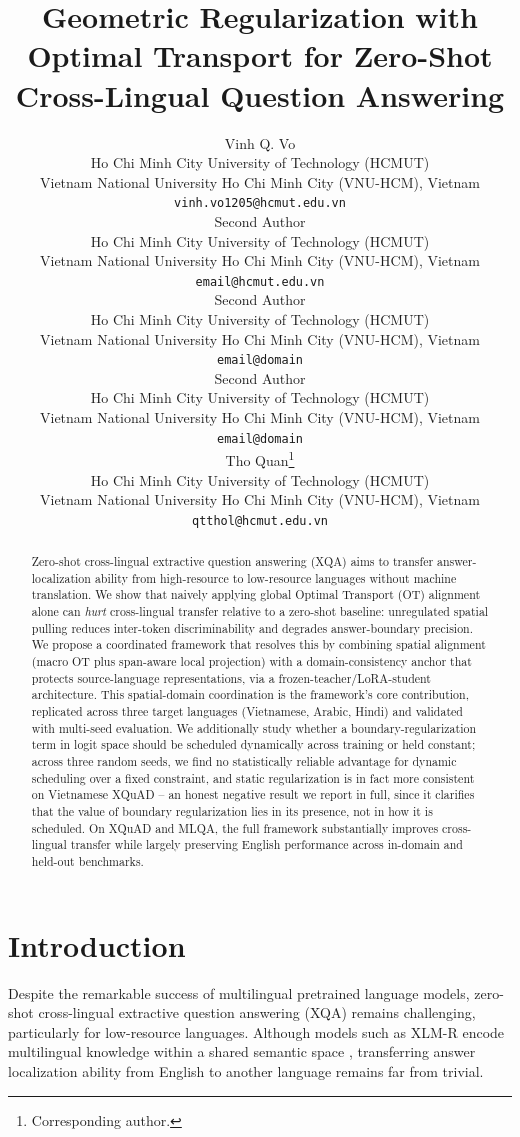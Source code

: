 \documentclass[11pt]{article}
\title{Geometric Regularization with Optimal Transport for Zero-Shot Cross-Lingual Question Answering}
\author{Vinh Q. Vo \\
  Ho Chi Minh City University of Technology (HCMUT) \\
  Vietnam National University Ho Chi Minh City (VNU-HCM), Vietnam \\
  \texttt{vinh.vo1205@hcmut.edu.vn} \\\And
  Second Author \\
  Ho Chi Minh City University of Technology (HCMUT) \\
  Vietnam National University Ho Chi Minh City (VNU-HCM), Vietnam \\
  \texttt{email@hcmut.edu.vn} \\\And
  Second Author \\
  Ho Chi Minh City University of Technology (HCMUT) \\
  Vietnam National University Ho Chi Minh City (VNU-HCM), Vietnam \\
  \texttt{email@domain} \\\And
  Second Author \\
  Ho Chi Minh City University of Technology (HCMUT) \\
  Vietnam National University Ho Chi Minh City (VNU-HCM), Vietnam \\
  \texttt{email@domain} \\\And
  Tho Quan\thanks{Corresponding author.} \\
  Ho Chi Minh City University of Technology (HCMUT) \\
  Vietnam National University Ho Chi Minh City (VNU-HCM), Vietnam \\
  \texttt{qtthol@hcmut.edu.vn}}
\begin{document}
\maketitle
\begin{abstract}

Zero-shot cross-lingual extractive question answering (XQA) aims to transfer answer-localization ability from high-resource to low-resource languages without machine translation. We show that naively applying global Optimal Transport (OT) alignment alone can \emph{hurt} cross-lingual transfer relative to a zero-shot baseline: unregulated spatial pulling reduces inter-token discriminability and degrades answer-boundary precision. We propose a coordinated framework that resolves this by combining spatial alignment (macro OT plus span-aware local projection) with a domain-consistency anchor that protects source-language representations, via a frozen-teacher/LoRA-student architecture. This spatial-domain coordination is the framework's core contribution, replicated across three target languages (Vietnamese, Arabic, Hindi) and validated with multi-seed evaluation. We additionally study whether a boundary-regularization term in logit space should be scheduled dynamically across training or held constant; across three random seeds, we find no statistically reliable advantage for dynamic scheduling over a fixed constraint, and static regularization is in fact more consistent on Vietnamese XQuAD -- an honest negative result we report in full, since it clarifies that the value of boundary regularization lies in its presence, not in how it is scheduled. On XQuAD and MLQA, the full framework substantially improves cross-lingual transfer while largely preserving English performance across in-domain and held-out benchmarks.

\end{abstract}

\section{Introduction}
Despite the remarkable success of multilingual pretrained language models, zero-shot cross-lingual extractive question answering (XQA) remains challenging, particularly for low-resource languages. Although models such as XLM-R encode multilingual knowledge within a shared semantic space \cite{wu-dredze-2019-beto}, transferring answer localization ability from English to another language remains far from trivial.
\end{document}
